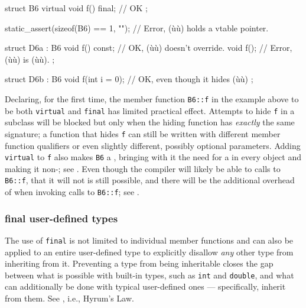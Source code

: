 {{\begin{emcppslisting}
struct B6
{
    virtual void f() final;  // OK
};

static_assert(sizeof(B6) == 1, "");  // Error, (ù{}ù) holds a vtable pointer.

struct D6a : B6
{
    void f() const;     // OK, (ù{}ù) doesn't override.
    void f();           // Error, (ù{}ù) is (ù{}ù).
};

struct D6b : B6
{
    void f(int i = 0);  // OK, even though it hides (ù{}ù)
};
\end{emcppslisting}
    

\noindent Declaring, for the first time, the member function \lstinline!B6::f! in the
example above to be both \lstinline!virtual! and \lstinline!final! has limited
practical effect. Attempts to hide \lstinline!f! in a subclass will be
blocked but only when the hiding function has \emph{exactly} the same
signature; a function that hides \lstinline!f! can still be written with
different member function qualifiers or even slightly different,
possibly optional parameters. Adding \lstinline!virtual! to \lstinline!f! also
makes \lstinline!B6! a , bringing with it the need
for a  in every object and making it
non-; see . Even
though the compiler will likely be able to  calls
to \lstinline!B6::f!, that it will not is still possible, and there will be
the additional overhead of  when invoking calls
to \lstinline!B6::f!; see .

\subsubsection[\lstinline!final! user-defined types]{{\SubsubsecCode final} user-defined types}\label{final-user-defined-types}

The use of \lstinline!final! is not limited to individual member functions
and can also be applied to an entire user-defined type to explicitly
disallow \emph{any} other type from inheriting from it. Preventing a
type from being inheritable closes the gap between what is possible with
built-in types, such as \lstinline!int! and \lstinline!double!, and what can
additionally be done with typical user-defined ones --- specifically,
inherit from them. See , i.e., Hyrum's Law.

}}
